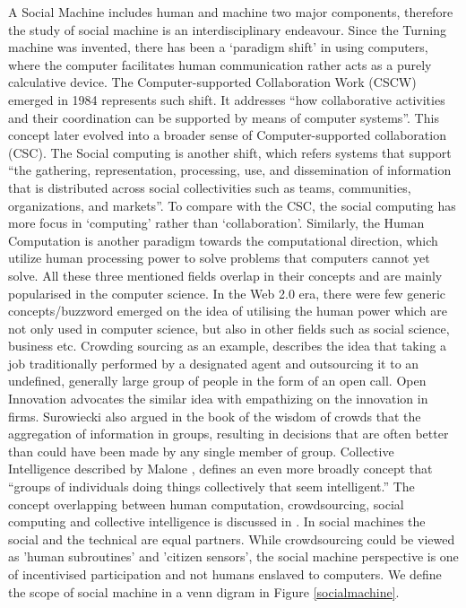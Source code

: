 \documentclass{sig-alternate}
\begin{document}
A Social Machine includes human and machine two major components, therefore the study of social machine is an interdisciplinary endeavour. Since the Turning machine was invented, there has been a `paradigm shift' \cite{kuhn1996structure} in using computers, where the computer facilitates human communication rather acts as a purely calculative device. The Computer-supported Collaboration Work (CSCW) \cite{grudin1994computer} emerged in 1984 represents such shift. It addresses ``how collaborative activities and their coordination can be supported by means of computer systems''. This concept later evolved into a broader sense of  Computer-supported collaboration (CSC). The Social computing \cite{parameswaran2007research} is another shift, which refers systems that support ``the gathering, representation, processing, use, and dissemination of information that is distributed across social collectivities such as teams, communities, organizations, and markets''. To compare with the CSC, the social computing has more focus in `computing' rather than `collaboration'. Similarly, the Human Computation \cite{von2009human} is another paradigm towards the computational direction, which utilize human processing power to solve problems that computers cannot yet solve. All these three mentioned fields overlap in their concepts and are mainly popularised in the computer science. In the Web 2.0 era, there were few generic concepts/buzzword emerged on the idea of utilising the human power which are not only used in computer science, but also in other fields such as social science, business etc. Crowding sourcing \cite{howe2006crowdsourcing} as an example, describes the idea that taking a job traditionally performed by a designated agent and outsourcing it to an undefined, generally large group of people in the form of an open call. Open Innovation \cite{chesbrough2008open} advocates the similar idea with empathizing on the innovation in firms. Surowiecki also argued in the book of the wisdom of crowds \cite{surowiecki2005wisdom} that the aggregation of information in groups, resulting in decisions that are often better than could have been made by any single member of group. Collective Intelligence described by Malone \cite{malone2009harnessing}, defines an even more broadly concept that ``groups of individuals doing things collectively that seem intelligent.''
The concept overlapping between human computation, crowdsourcing, social computing and collective intelligence is discussed in \cite{quinn2011human}.
In  social machines  the  social and  the  technical are equal  partners. While  crowdsourcing  could  be  viewed  as  'human  subroutines'  and  'citizen  sensors',  the social machine perspective is one of incentivised participation and not humans enslaved to computers. We define the scope of social machine in a venn digram in Figure \ref{socialmachine}.
\end{document}
